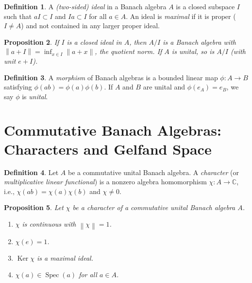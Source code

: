 \documentclass[a4paper,12pt]{book}
\DeclareMathOperator{\Ker}{Ker}
\DeclareMathOperator{\Spec}{Spec}
\newcommand{\C}{\mathbb{C}}
\newcommand{\norm}[1]{\left\| #1 \right\|}
\theoremstyle{definition}
\newtheorem{definition}{Definition}[chapter]
\theoremstyle{plain}
\newtheorem{proposition}[definition]{Proposition}
\theoremstyle{remark}
\begin{document}

\begin{definition}\label{def:ideal-algebra}
A \emph{(two-sided) ideal} in a Banach algebra $A$ is a closed subspace $I$ such
that $aI \subset I$ and $Ia \subset I$ for all $a \in A$. An ideal is
\emph{maximal} if it is proper ($I \ne A$) and not contained
in any larger proper ideal.
\end{definition}

\begin{proposition}\label{prop:quotient-algebra}
If $I$ is a closed ideal in $A$, then $A/I$ is a Banach algebra with
$\norm{a + I} = \inf_{x \in I} \norm{a + x}$, the quotient norm.
If $A$ is unital, so is $A/I$ (with unit $e + I$).
\end{proposition}

\begin{definition}\label{def:algebra-morphism}
A \emph{morphism} of Banach algebras is a bounded linear map
$\phi \colon A \to B$ satisfying $\phi(ab) = \phi(a)\phi(b)$. If $A$ and $B$ are
unital and $\phi(e_A) = e_B$, we say $\phi$ is \emph{unital}.
\end{definition}


\section{Commutative Banach Algebras: Characters and Gelfand Space}
\label{sec:gelfand-space}


\begin{definition}\label{def:character}
Let $A$ be a commutative unital Banach algebra. A \emph{character} (or
\emph{multiplicative linear functional})
is a nonzero algebra homomorphism $\chi \colon A \to \C$, i.e., $\chi(ab) = \chi(a)\chi(b)$
and $\chi \ne 0$.
\end{definition}

\begin{proposition}\label{prop:character-properties}
Let $\chi$ be a character of a commutative unital Banach algebra $A$.
\begin{enumerate}[label=(\roman*)]
  \item $\chi$ is continuous with $\norm{\chi} = 1$.
  \item $\chi(e) = 1$.
  \item $\Ker\chi$ is a maximal ideal.
  \item $\chi(a) \in \Spec(a)$ for all $a \in A$.
\end{enumerate}
\end{proposition}
\end{document}
